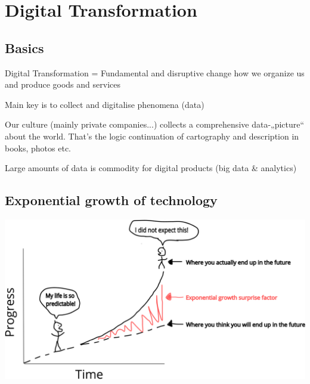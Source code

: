 \section{Digital Transformation}
\subsection{Basics}
\begin{compactitem}
	\item Digital Transformation = Fundamental and disruptive change how we organize us and produce goods and services
	\item Main key is to collect and digitalise phenomena (data)
	\item Our culture (mainly private companies...) collects a comprehensive data-„picture“ about the world. That’s the logic continuation of cartography and description in books, photos etc.
	\item Large amounts of data is commodity for digital products (big data	\& analytics)
\end{compactitem}

\subsection{Exponential growth of technology}
\includegraphics[width=1\linewidth]{images/exponential_growth_of_technology}


